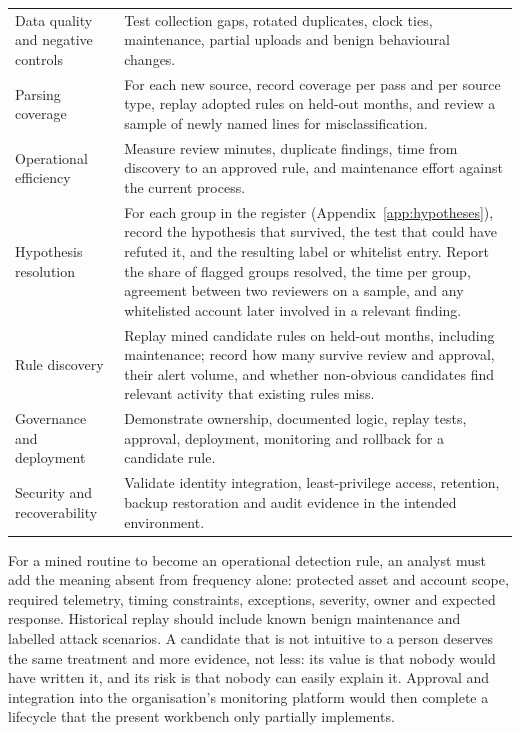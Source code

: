 \documentclass[11pt,a4paper]{article}
\begin{document}
\begin{longtable}{>{\RaggedRight\arraybackslash}p{}>{\RaggedRight\arraybackslash}p{}}
Data quality and negative controls & Test collection gaps, rotated duplicates, clock ties, maintenance, partial uploads and benign behavioural changes. \\[3pt]
Parsing coverage & For each new source, record coverage per pass and per source type, replay adopted rules on held-out months, and review a sample of newly named lines for misclassification. \\[3pt]
Operational efficiency & Measure review minutes, duplicate findings, time from discovery to an approved rule, and maintenance effort against the current process. \\[3pt]
Hypothesis resolution & For each group in the register (Appendix~\ref{app:hypotheses}), record the hypothesis that survived, the test that could have refuted it, and the resulting label or whitelist entry. Report the share of flagged groups resolved, the time per group, agreement between two reviewers on a sample, and any whitelisted account later involved in a relevant finding. \\[3pt]
Rule discovery & Replay mined candidate rules on held-out months, including maintenance; record how many survive review and approval, their alert volume, and whether non-obvious candidates find relevant activity that existing rules miss. \\[3pt]
Governance and deployment & Demonstrate ownership, documented logic, replay tests, approval, deployment, monitoring and rollback for a candidate rule. \\[3pt]
Security and recoverability & Validate identity integration, least-privilege access, retention, backup restoration and audit evidence in the intended environment. \\[3pt]
\end{longtable}
\endgroup


For a mined routine to become an operational detection rule, an analyst must add the meaning absent from frequency alone: protected asset and account scope, required telemetry, timing constraints, exceptions, severity, owner and expected response. Historical replay should include known benign maintenance and labelled attack scenarios. A candidate that is not intuitive to a person deserves the same treatment and more evidence, not less: its value is that nobody would have written it, and its risk is that nobody can easily explain it. Approval and integration into the organisation's monitoring platform would then complete a lifecycle that the present workbench only partially implements.
\end{document}
